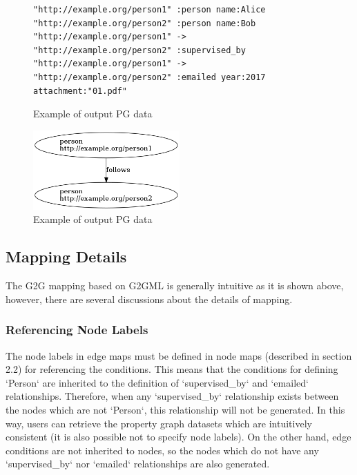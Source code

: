 \documentclass[runningheads]{llncs}
\begin{document}
\begin{figure}[!t]
\begin{scriptsize}
\begin{verbatim}
"http://example.org/person1" :person name:Alice
"http://example.org/person2" :person name:Bob
"http://example.org/person1" -> "http://example.org/person2" :supervised_by
"http://example.org/person1" -> "http://example.org/person2" :emailed year:2017 attachment:"01.pdf"
\end{verbatim}
\end{scriptsize}
\caption{Example of output PG data}
\label{fig:example-pg}
\end{figure}


\begin{figure}
\center
\includegraphics[width=0.5\textwidth]{pg_example5.png}
\caption{Example of output PG data}
\label{fig:pg_example5}
\end{figure}


\subsection{Mapping Details}
The G2G mapping based on G2GML is generally intuitive as it is shown above, however, there are several discussions about the details of mapping.

\subsubsection{Referencing Node Labels}
The node labels in edge maps must be defined in node maps  (described in section 2.2) for referencing the conditions. This means that the conditions for defining `Person` are inherited to the definition of `supervised\_by` and `emailed` relationships. Therefore, when any `supervised\_by` relationship exists between the nodes which are not `Person`, this relationship will not be generated. In this way, users can retrieve the property graph datasets which are intuitively consistent (it is also possible not to specify node labels). On the other hand, edge conditions are not inherited to nodes, so the nodes which do not have any `supervised\_by` nor `emailed` relationships are also generated.
\end{document}

